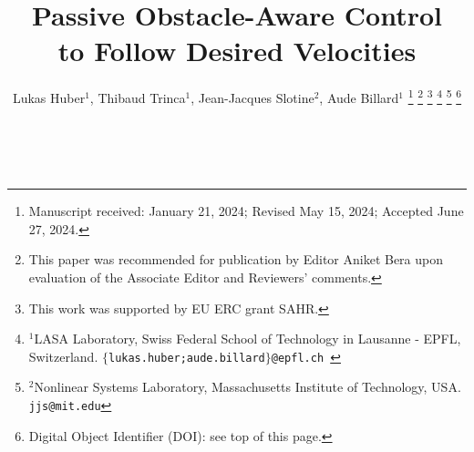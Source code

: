 \documentclass[letterpaper, times, mathptm, 10 pt, journal, twoside]{ieeeconf}
\begin{document}
\newcommand{\vect}[1]{\boldsymbol{#1}}
\newcommand{\vecs}[1]{\boldsymbol{#1}}
\newcommand{\matr}[1]{\boldsymbol{#1}}
\newcommand{\matd}[1]{\mathcal{#1}}

\newcommand{\dotprod}[2]{\left\langle {#1}, \, {#2} \right\rangle}
\newcommand{\normdotprod}[2]{\frac{\left\langle #1, \, #2 \right\rangle}{\| #1 \| \, \| #2 \|}}


\newtheorem{theorem}{Theorem}[section]
\newtheorem{corollary}{Corollary}[section]
\newtheorem{lemma}{Lemma}[section]
\newtheorem{definition}{Definition}[section]

\newif\ifthesis
\thesisfalse

\newif\iflong
\longfalse

\iflong
 \newcommand{\editcolor}[1]{\textcolor{black}{#1}}
\else
\newcommand{\editcolor}[1]{\textcolor{black}{#1}}
\fi

\iflong
\else
\setlength{\headheight}{1mm}
\fi

\title{
\LARGE \bf
Passive Obstacle-Aware Control \\
to Follow Desired Velocities
}

\author{Lukas Huber$^{1}$, Thibaud Trinca$^{1}$, Jean-Jacques Slotine$^{2}$, Aude Billard$^{1}$
\thanks{
Manuscript received: January 21, 2024; 
Revised May 15, 2024;
Accepted June 27, 2024.
}
\thanks{This paper was recommended for publication by Editor Aniket Bera upon evaluation of the Associate Editor and Reviewers’ comments.}
\thanks{This work was supported by EU ERC grant SAHR.} %
\thanks{$^{1}$LASA Laboratory, Swiss Federal School of Technology in Lausanne - EPFL, Switzerland. \tt $\{$lukas.huber;aude.billard$\}$@epfl.ch }
\thanks{$^{2}$Nonlinear Systems Laboratory,  Massachusetts Institute of Technology, USA. \tt jjs@mit.edu}   %
\thanks{Digital Object Identifier (DOI): see top of this page.}
}

\maketitle
{} 
\end{document}

